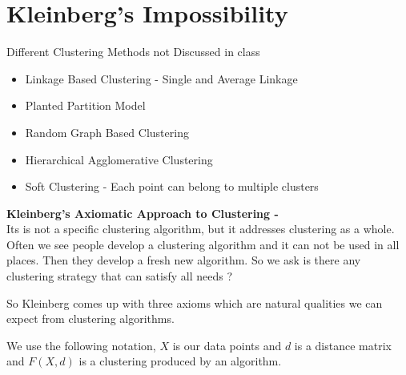 \section{Kleinberg's Impossibility}
  Different Clustering Methods not Discussed in class
 
\begin{itemize}
  \item Linkage Based Clustering - Single and Average Linkage \cite{ackerman}
  \item Planted Partition Model \cite{chaudhuri}
  \item Random Graph Based Clustering
  \item Hierarchical Agglomerative Clustering \cite{aglclus}
  \item Soft Clustering - Each point can belong to multiple clusters \cite{bilmes}
\end{itemize}

\textbf{Kleinberg's Axiomatic Approach to Clustering -} \cite{klnbrgimp} \\
Its is not a specific clustering algorithm, but it addresses clustering as a whole. Often we see people develop a clustering algorithm and it can not be used in all places. Then they develop a fresh new algorithm. So we ask is there any clustering strategy that can satisfy all needs ?

So Kleinberg comes up with three axioms which are natural qualities we can expect from clustering algorithms.

We use the following notation, $X$ is our data points and $d$ is a distance matrix and $F(X,d)$ is a clustering produced by an algorithm.\\\\

